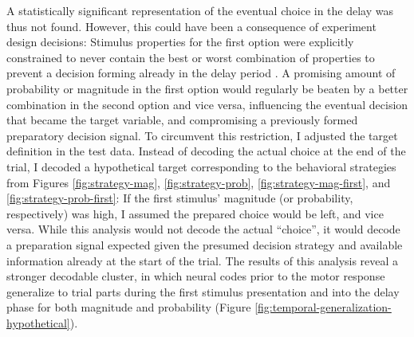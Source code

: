 A statistically significant representation of the eventual choice in the delay was thus not found.
However, this could have been a consequence of experiment design decisions:
Stimulus properties for the first option were explicitly constrained to never contain the best or worst combination of properties to prevent a decision forming already in the delay period \citep{curtis2010beyond}.
A promising amount of probability or magnitude in the first option would regularly be beaten by a better combination in the second option and vice versa, influencing the eventual decision that became the target variable, and compromising a previously formed preparatory decision signal.
To circumvent this restriction, I adjusted the target definition in the test data.
Instead of decoding the actual choice at the end of the trial, I decoded a hypothetical target corresponding to the behavioral strategies from Figures \ref{fig:strategy-mag}, \ref{fig:strategy-prob}, \ref{fig:strategy-mag-first}, and \ref{fig:strategy-prob-first}:
If the first stimulus' magnitude (or probability, respectively) was high, I assumed the prepared choice would be left, and vice versa.
While this analysis would not decode the actual ``choice'', it would decode a preparation signal expected given the presumed decision strategy and available information already at the start of the trial.
The results of this analysis reveal a stronger decodable cluster, in which neural codes prior to the motor response generalize to trial parts during the first stimulus presentation and into the delay phase for both magnitude and probability (Figure \ref{fig:temporal-generalization-hypothetical}). \\

